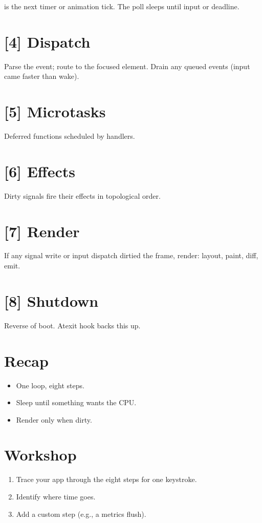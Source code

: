  is the next timer or animation tick. The
poll sleeps until input or deadline.

\section{[4] Dispatch}

Parse the event; route to the focused element. Drain any
queued events (input came faster than wake).

\section{[5] Microtasks}

Deferred functions scheduled by handlers.

\section{[6] Effects}

Dirty signals fire their effects in topological order.

\section{[7] Render}

If any signal write or input dispatch dirtied the frame,
render: layout, paint, diff, emit.

\section{[8] Shutdown}

Reverse of boot. Atexit hook backs this up.

\section{Recap}

\begin{recap}
\begin{itemize}[leftmargin=*]
  \item One loop, eight steps.
  \item Sleep until something wants the CPU.
  \item Render only when dirty.
\end{itemize}
\end{recap}

\section*{Workshop}

\begin{enumerate}[leftmargin=*]
  \item Trace your app through the eight steps for one
    keystroke.
  \item Identify where time goes.
  \item Add a custom step (e.g., a metrics flush).
\end{enumerate}
